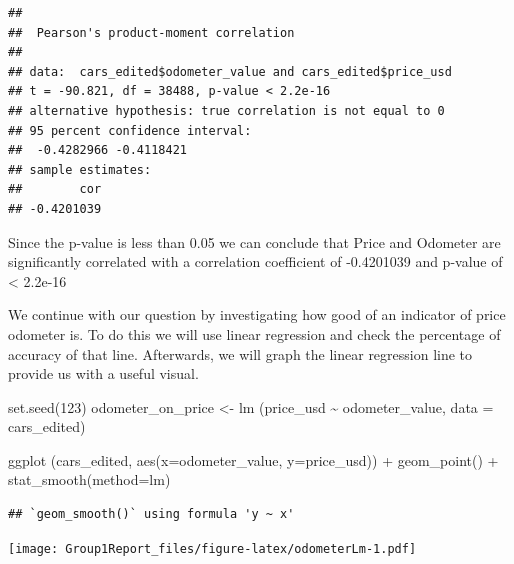 \documentclass[
]{article}
\newenvironment{Shaded}{\begin{snugshade}}{\end{snugshade}}
\newcommand{\AttributeTok}[1]{\textcolor[rgb]{0.77,0.63,0.00}{#1}}
\newcommand{\CommentTok}[1]{\textcolor[rgb]{0.56,0.35,0.01}{\textit{#1}}}
\newcommand{\DecValTok}[1]{\textcolor[rgb]{0.00,0.00,0.81}{#1}}
\newcommand{\FunctionTok}[1]{\textcolor[rgb]{0.00,0.00,0.00}{#1}}
\newcommand{\NormalTok}[1]{#1}
\newcommand{\OtherTok}[1]{\textcolor[rgb]{0.56,0.35,0.01}{#1}}
\newcommand{\SpecialCharTok}[1]{\textcolor[rgb]{0.00,0.00,0.00}{#1}}
\begin{document}
\begin{Shaded}
\end{Shaded}

\begin{verbatim}
## 
##  Pearson's product-moment correlation
## 
## data:  cars_edited$odometer_value and cars_edited$price_usd
## t = -90.821, df = 38488, p-value < 2.2e-16
## alternative hypothesis: true correlation is not equal to 0
## 95 percent confidence interval:
##  -0.4282966 -0.4118421
## sample estimates:
##        cor 
## -0.4201039
\end{verbatim}

Since the p-value is less than 0.05 we can conclude that Price and
Odometer are significantly correlated with a correlation coefficient of
-0.4201039 and p-value of \textless{} 2.2e-16

We continue with our question by investigating how good of an indicator
of price odometer is. To do this we will use linear regression and check
the percentage of accuracy of that line. Afterwards, we will graph the
linear regression line to provide us with a useful visual.

\begin{Shaded}
\begin{Highlighting}[]
\FunctionTok{set.seed}\NormalTok{(}\DecValTok{123}\NormalTok{)}
\NormalTok{odometer\_on\_price }\OtherTok{\textless{}{-}} \FunctionTok{lm}\NormalTok{ (price\_usd }\SpecialCharTok{\textasciitilde{}}\NormalTok{ odometer\_value, }\AttributeTok{data =}\NormalTok{ cars\_edited)}

\FunctionTok{ggplot}\NormalTok{ (cars\_edited, }\FunctionTok{aes}\NormalTok{(}\AttributeTok{x=}\NormalTok{odometer\_value, }\AttributeTok{y=}\NormalTok{price\_usd)) }\SpecialCharTok{+} \FunctionTok{geom\_point}\NormalTok{() }\SpecialCharTok{+} \FunctionTok{stat\_smooth}\NormalTok{(}\AttributeTok{method=}\NormalTok{lm)}
\end{Highlighting}
\end{Shaded}

\begin{verbatim}
## `geom_smooth()` using formula 'y ~ x'
\end{verbatim}

\texttt{[image: Group1Report\_files/figure-latex/odometerLm-1.pdf]}
\end{document}
